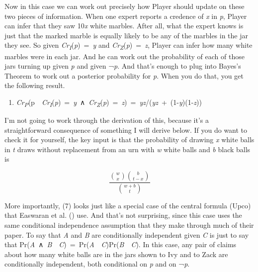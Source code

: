 \documentclass[
  10pt,
  letterpaper,
  DIV=11,
  numbers=noendperiod,
  twoside]{scrartcl}
\providecommand{\tightlist}{%
  \setlength{\itemsep}{0pt}\setlength{\parskip}{0pt}}\usepackage{longtable,booktabs,array}
\begin{document}
Now in this case we can work out precisely how Player should update on
these two pieces of information. When one expert reports a credence of
\emph{x} in \emph{p}, Player can infer that they saw 10\emph{x} white
marbles. After all, what the expert knows is just that the marked marble
is equally likely to be any of the marbles in the jar they see. So given
\emph{Cr\textsubscript{I}}(\emph{p})~=~\emph{y} and
\emph{Cr\textsubscript{Z}}(\emph{p})~=~\emph{z}, Player can infer how
many white marbles were in each jar. And he can work out the probability
of each of those jars turning up given \emph{p} and given ¬\emph{p}. And
that's enough to plug into Bayes's Theorem to work out a posterior
probability for \emph{p}. When you do that, you get the following
result.

\begin{enumerate}
\def\labelenumi{(\arabic{enumi})}
\setcounter{enumi}{6}
\tightlist
\item
  \emph{Cr\textsubscript{P}}(p~\textbar~\emph{Cr\textsubscript{I}}(\emph{p})~=~\emph{y}~∧~\emph{Cr\textsubscript{Z}}(\emph{p})~=~\emph{z})~=~\emph{yz}/(\emph{yz}~+~(1-\emph{y})(1-\emph{z}))
\end{enumerate}

I'm not going to work through the derivation of this, because it's a
straightforward consequence of something I will derive below. If you do
want to check it for yourself, the key input is that the probability of
drawing \emph{x} white balls in \emph{t} draws without replacement from
an urn with \emph{w} white balls and \emph{b} black balls is

\[
\frac{\binom{w}{x} \binom{b}{t-x}}{\binom{w+b}{t}}
\]

More importantly, (7) looks just like a special case of the central
formula (Upco) that Easwaran et al.
() use. And that's not surprising,
since this case uses the same conditional independence assumption that
they make through much of their paper. To say that \emph{A} and \emph{B}
are conditionally independent given \emph{C} is just to say that
Pr(\emph{A}~∧~\emph{B}~\textbar~\emph{C})~=~Pr(\emph{A}~\textbar~\emph{C})Pr(\emph{B}~\textbar~\emph{C}).
In this case, any pair of claims about how many white balls are in the
jars shown to Ivy and to Zack are conditionally independent, both
conditional on \emph{p} and on ¬\emph{p}.
\end{document}
